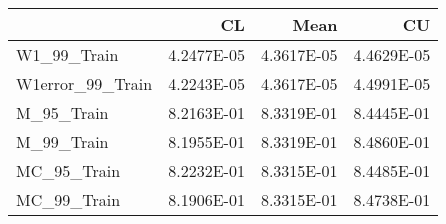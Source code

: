 \begin{tabular}{lrrr}
\toprule
{} &         CL &       Mean &         CU \\
\midrule
W1\_99\_Train      & 4.2477E-05 & 4.3617E-05 & 4.4629E-05 \\
W1error\_99\_Train & 4.2243E-05 & 4.3617E-05 & 4.4991E-05 \\
M\_95\_Train       & 8.2163E-01 & 8.3319E-01 & 8.4445E-01 \\
M\_99\_Train       & 8.1955E-01 & 8.3319E-01 & 8.4860E-01 \\
MC\_95\_Train      & 8.2232E-01 & 8.3315E-01 & 8.4485E-01 \\
MC\_99\_Train      & 8.1906E-01 & 8.3315E-01 & 8.4738E-01 \\
\bottomrule
\end{tabular}
